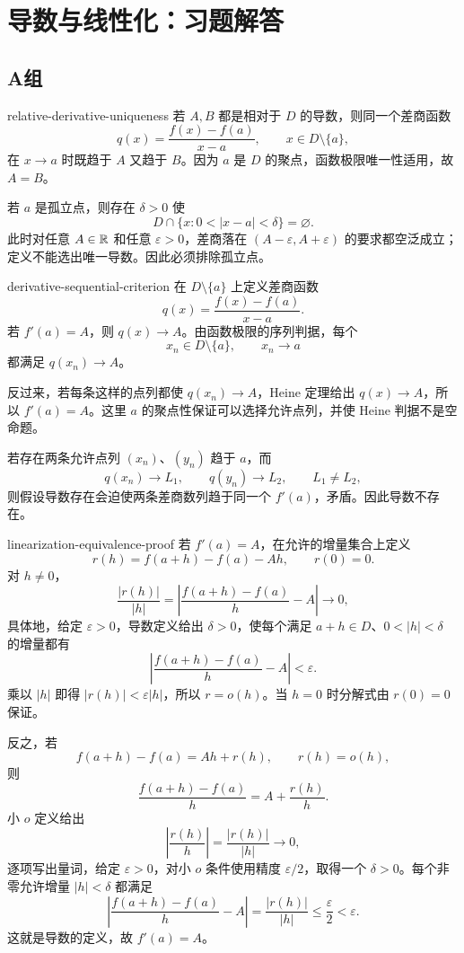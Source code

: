 \chapter{导数与线性化：习题解答}

\section*{A组}

\begin{solution}{relative-derivative-uniqueness}
若 \(A,B\) 都是相对于 \(D\) 的导数，则同一个差商函数
\[
 q(x)=\frac{f(x)-f(a)}{x-a},
 \qquad x\in D\setminus\{a\},
\]
在 \(x\to a\) 时既趋于 \(A\) 又趋于 \(B\)。因为 \(a\) 是 \(D\) 的聚点，函数极限唯一性适用，故 \(A=B\)。

若 \(a\) 是孤立点，则存在 \(\delta>0\) 使
\[
 D\cap\{x:0<|x-a|<\delta\}=\varnothing.
\]
此时对任意 \(A\in\mathbb{R}\) 和任意 \(\varepsilon>0\)，差商落在 \((A-\varepsilon,A+\varepsilon)\) 的要求都空泛成立；定义不能选出唯一导数。因此必须排除孤立点。
\end{solution}

\begin{solution}{derivative-sequential-criterion}
在 \(D\setminus\{a\}\) 上定义差商函数
\[
 q(x)=\frac{f(x)-f(a)}{x-a}.
\]
若 \(f'(a)=A\)，则 \(q(x)\to A\)。由函数极限的序列判据，每个
\[
 x_n\in D\setminus\{a\},\qquad x_n\to a
\]
都满足 \(q(x_n)\to A\)。

反过来，若每条这样的点列都使 \(q(x_n)\to A\)，Heine 定理给出 \(q(x)\to A\)，所以 \(f'(a)=A\)。这里 \(a\) 的聚点性保证可以选择允许点列，并使 Heine 判据不是空命题。

若存在两条允许点列 \((x_n)\)、\((y_n)\) 趋于 \(a\)，而
\[
 q(x_n)\to L_1,\qquad q(y_n)\to L_2,\qquad L_1\ne L_2,
\]
则假设导数存在会迫使两条差商数列趋于同一个 \(f'(a)\)，矛盾。因此导数不存在。
\end{solution}

\begin{solution}{linearization-equivalence-proof}
若 \(f'(a)=A\)，在允许的增量集合上定义
\[
 r(h)=f(a+h)-f(a)-Ah,\qquad r(0)=0.
\]
对 \(h\ne0\)，
\[
 \frac{|r(h)|}{|h|}
 =\left|\frac{f(a+h)-f(a)}h-A\right|\longrightarrow0,
\]
具体地，给定 \(\varepsilon>0\)，导数定义给出 \(\delta>0\)，使每个满足 \(a+h\in D\)、\(0<|h|<\delta\) 的增量都有
\[
 \left|\frac{f(a+h)-f(a)}h-A\right|<\varepsilon.
\]
乘以 \(|h|\) 即得 \(|r(h)|<\varepsilon|h|\)，所以 \(r=o(h)\)。当 \(h=0\) 时分解式由 \(r(0)=0\) 保证。

反之，若
\[
 f(a+h)-f(a)=Ah+r(h),\qquad r(h)=o(h),
\]
则
\[
 \frac{f(a+h)-f(a)}h
 =A+\frac{r(h)}h.
\]
小 \(o\) 定义给出
\[
 \left|\frac{r(h)}h\right|
 =\frac{|r(h)|}{|h|}\longrightarrow0,
\]
逐项写出量词，给定 \(\varepsilon>0\)，对小 \(o\) 条件使用精度 \(\varepsilon/2\)，取得一个 \(\delta>0\)。每个非零允许增量 \(|h|<\delta\) 都满足
\[
 \left|\frac{f(a+h)-f(a)}h-A\right|
 =\frac{|r(h)|}{|h|}\le\frac\varepsilon2<\varepsilon.
\]
这就是导数的定义，故 \(f'(a)=A\)。
\end{solution}

